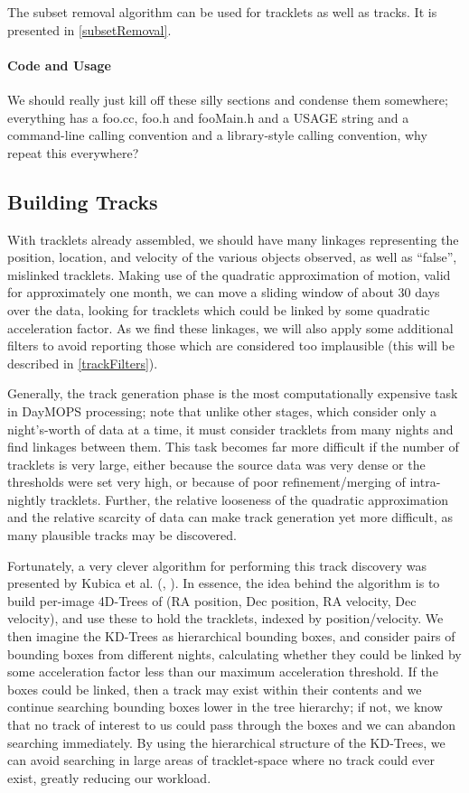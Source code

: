The subset removal algorithm can be used for tracklets as well as
tracks.  It is presented in \ref{subsetRemoval}.


\paragraph{Code and Usage}
We should really just kill off these silly sections and condense them
somewhere; everything has a foo.cc, foo.h and fooMain.h and a USAGE
string and a command-line calling convention and a library-style
calling convention, why repeat this everywhere?



\subsection{Building Tracks}

With tracklets already assembled, we should have many linkages
representing the position, location, and velocity of the various
objects observed, as well as ``false'', mislinked tracklets.  Making
use of the quadratic approximation of motion, valid for approximately
one month, we can move a sliding window of about 30 days over the
data, looking for tracklets which could be linked by some quadratic
acceleration factor.  As we find these linkages, we will also apply
some additional filters to avoid reporting those which are considered
too implausible (this will be described in \ref{trackFilters}).

Generally, the track generation phase is the most computationally
expensive task in DayMOPS processing; note that unlike other stages,
which consider only a night's-worth of data at a time, it must
consider tracklets from many nights and find linkages between them.
This task becomes far more difficult if the number of tracklets is
very large, either because the source data was very dense or the
thresholds were set very high, or because of poor refinement/merging
of intra-nightly tracklets.  Further, the relative looseness of the
quadratic approximation and the relative scarcity of data can make
track generation yet more difficult, as many plausible tracks may be
discovered.

Fortunately, a very clever algorithm for performing this track
discovery was presented by Kubica et al. (\citet{kubica_thesis},
\citet{Kubica:2005:MTA:1081870.1081889}).  In essence, the idea behind
the algorithm is to build per-image 4D-Trees of (RA position, Dec
position, RA velocity, Dec velocity), and use these to hold the
tracklets, indexed by position/velocity.  We then imagine the KD-Trees
as hierarchical bounding boxes, and consider pairs of bounding boxes
from different nights, calculating whether they could be linked by
some acceleration factor less than our maximum acceleration threshold.
If the boxes could be linked, then a track may exist within their
contents and we continue searching bounding boxes lower in the tree
hierarchy; if not, we know that no track of interest to us could pass
through the boxes and we can abandon searching immediately.  By using
the hierarchical structure of the KD-Trees, we can avoid searching in
large areas of tracklet-space where no track could ever exist, greatly
reducing our workload.


